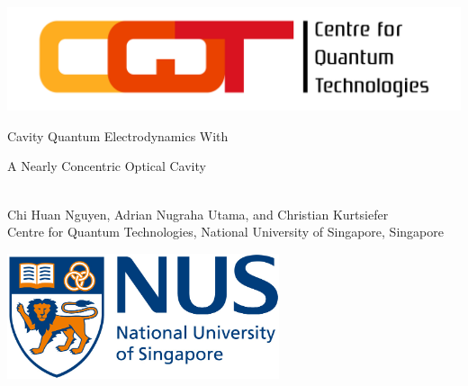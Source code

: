 \documentclass[portrait,a0,final]{a0poster} %
\newenvironment{poster}{
  \begin{center}
  \begin{minipage}[c]{0.98\textwidth}
}{
  \end{minipage} 
  \end{center}
}
\begin{document}

\begin{poster}
\large \sf
\vspace{2cm}
\begin{center}

      \begin{minipage}[c]{0.05\textwidth}
        \begin{center}
          \includegraphics[width=14cm,angle=0]{CQT_Logo_CMYK.jpg}
        \end{center}
      \end{minipage}\hspace{10cm}
      \begin{minipage}[c]{0.7\textwidth}
        \begin{center}
          {\sc \huge Cavity Quantum Electrodynamics With  \\ \vspace{0.8cm}
          
A Nearly Concentric Optical Cavity}\\[9mm]
          {\large Chi Huan Nguyen, Adrian Nugraha Utama, and Christian Kurtsiefer}\\[6mm]
          Centre for Quantum Technologies, National University of Singapore, Singapore\\
          
        \end{center}
      \end{minipage}
      \begin{minipage}[l]{0.1\textwidth}
        \begin{center}
          \includegraphics[width=8cm,angle=0]{NUS_logo_full-horizontal.jpg}
        \end{center}
      \end{minipage}
\end{center}


\end{poster}
\end{document}
